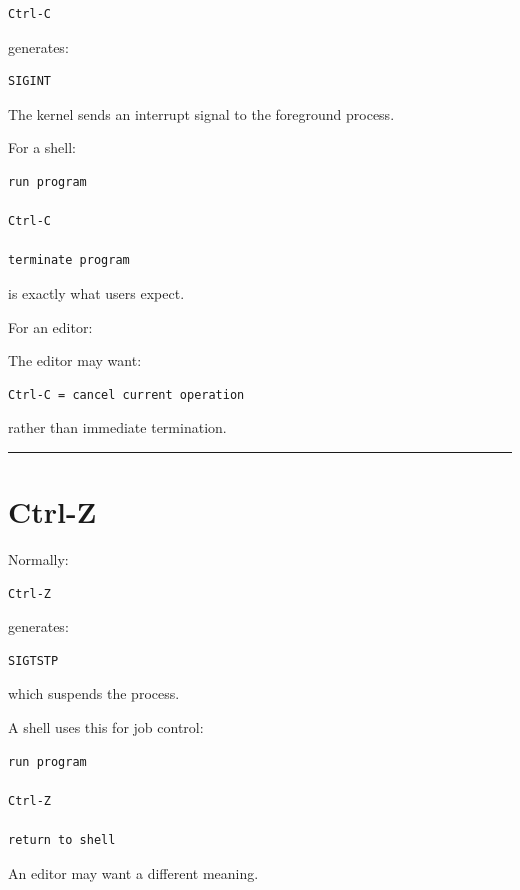 \documentclass[
  oneside,
  openany]{book}
\begin{document}
\begin{verbatim}
Ctrl-C
\end{verbatim}

generates:

\begin{verbatim}
SIGINT
\end{verbatim}

The kernel sends an interrupt signal to the foreground process.

For a shell:

\begin{verbatim}
run program

Ctrl-C

terminate program
\end{verbatim}

is exactly what users expect.

For an editor:

The editor may want:

\begin{verbatim}
Ctrl-C = cancel current operation
\end{verbatim}

rather than immediate termination.

\begin{center}\rule{0.5\linewidth}{0.5pt}\end{center}

\hypertarget{ctrl-z}{%
\section{Ctrl-Z}\label{ctrl-z}}

Normally:

\begin{verbatim}
Ctrl-Z
\end{verbatim}

generates:

\begin{verbatim}
SIGTSTP
\end{verbatim}

which suspends the process.

A shell uses this for job control:

\begin{verbatim}
run program

Ctrl-Z

return to shell
\end{verbatim}

An editor may want a different meaning.
\end{document}
